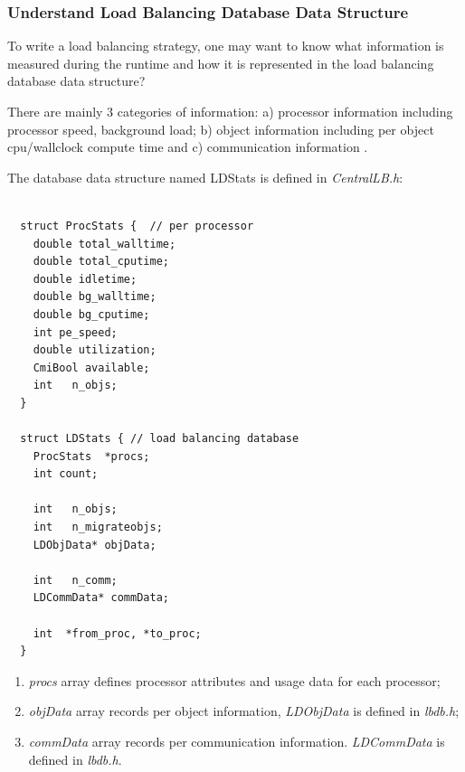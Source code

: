 \subsubsection{Understand Load Balancing Database Data Structure}

\label{lbdatabase}

To write a load balancing strategy, one may want to know 
what information is measured during the runtime and how it is represented in
the load balancing database data structure?

There are mainly 3 categories of information: a) processor information including processor speed, background load; b) object information including per object
cpu/wallclock compute time and c) communication information .

The database data structure named {\kw LDStats} is defined in {\em CentralLB.h}:

\begin{verbatim}

  struct ProcStats {  // per processor
    double total_walltime;
    double total_cputime;
    double idletime;
    double bg_walltime;
    double bg_cputime;
    int pe_speed;
    double utilization;
    CmiBool available;
    int   n_objs;
  }

  struct LDStats { // load balancing database
    ProcStats  *procs;
    int count;

    int   n_objs;
    int   n_migrateobjs;
    LDObjData* objData;

    int   n_comm;
    LDCommData* commData;

    int  *from_proc, *to_proc;
  }

\end{verbatim}

\begin{enumerate}
\item {\em procs} array defines processor attributes and usage data for each
processor;
\item {\em objData} array records per object information, {\em LDObjData} is defined in {\em lbdb.h};
\item {\em commData} array records per communication information. {\em LDCommData} is defined in {\em lbdb.h}.
\end{enumerate}

